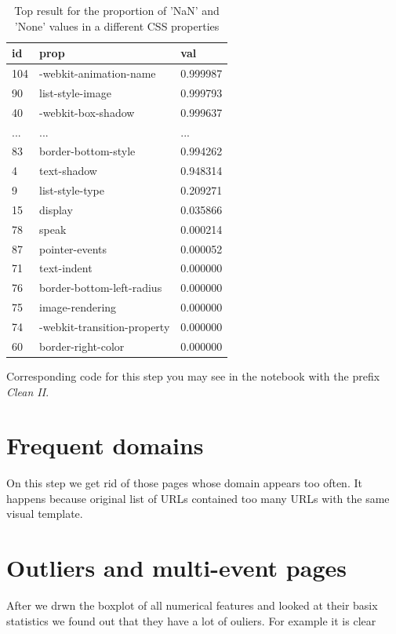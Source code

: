 \begin{table}[h]
\begin{center}
\begin{tabular}{| p{2cm} | p{5cm}| p{3cm} |}
\hline
id	&	prop	&	val \\
\hline
104	&	-webkit-animation-name	&	0.999987 \\
\hline
90	&	list-style-image	&	0.999793 \\
\hline
40	&	-webkit-box-shadow	&	0.999637 \\
\hline
...	&	...	&	... \\
\hline
83	&	border-bottom-style	&	0.994262 \\
\hline
4	&	text-shadow	&	0.948314 \\
\hline
9	&	list-style-type	&	0.209271 \\
\hline
15	&	display	&	0.035866 \\
\hline
78	&	speak	&	0.000214 \\
\hline
87	&	pointer-events	&	0.000052 \\
\hline
71	&	text-indent	&	0.000000 \\
\hline
76	&	border-bottom-left-radius	&	0.000000 \\
\hline
75	&	image-rendering	&	0.000000 \\
\hline
74	&	-webkit-transition-property	&	0.000000 \\
\hline
60	&	border-right-color	&	0.000000 \\
\hline
\end{tabular}
\caption{Top result for the proportion of 'NaN' and 'None' values in a different CSS properties}
\label{table:cssnan}
\end{center}
\end{table}


Corresponding code for this step you may see in the notebook with the prefix \textit{Clean II}.

\section*{Frequent domains}
On this step we get rid of those pages whose domain appears too often. It happens because original list of URLs contained too many URLs with the same visual template.   
\section*{Outliers and multi-event pages}
After we drwn the boxplot of all numerical features and looked at their basix statistics we found out that they have a lot of ouliers. For example it is clear 


